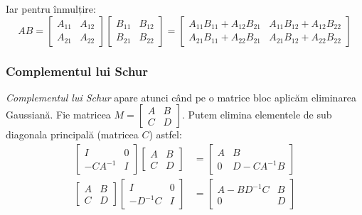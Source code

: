 \documentclass{exam}
\begin{document}
Iar pentru înmulțire:
\begin{equation*}
	A B = \begin{bmatrix} A_{11} & A_{12} \\ A_{21} & A_{22} \end{bmatrix} \begin{bmatrix} B_{11} & B_{12} \\ B_{21} & B_{22} \end{bmatrix} = \begin{bmatrix} A_{11} B_{11} + A_{12} B_{21} & A_{11} B_{12} + A_{12} B_{22} \\ A_{21} B_{11} + A_{22} B_{21} & A_{21} B_{12} + A_{22} B_{22} \end{bmatrix}
\end{equation*}

\subsubsection{Complementul lui Schur}
\textit{Complementul lui Schur} \cite{Schur1917} apare atunci când pe o matrice bloc aplicăm
eliminarea Gaussiană. Fie matricea $M = \begin{bmatrix} A & B \\ C & D \end{bmatrix}$.
Putem elimina elementele de sub diagonala principală (matricea $C$) astfel:
\begin{align*}
	\begin{bmatrix}
		I         & 0 \\
		-C A^{-1} & I
	\end{bmatrix}
	\begin{bmatrix}
		A & B \\
		C & D
	\end{bmatrix}
	 & =
	\begin{bmatrix}
		A & B              \\
		0 & D - C A^{-1} B
	\end{bmatrix} \\
	\begin{bmatrix}
		A & B \\
		C & D
	\end{bmatrix}
	\begin{bmatrix}
		I         & 0 \\
		-D^{-1} C & I
	\end{bmatrix}
	 & =
	\begin{bmatrix}
		A - B D^{-1} C & B \\
		0              & D
	\end{bmatrix}
\end{align*}
\end{document}
